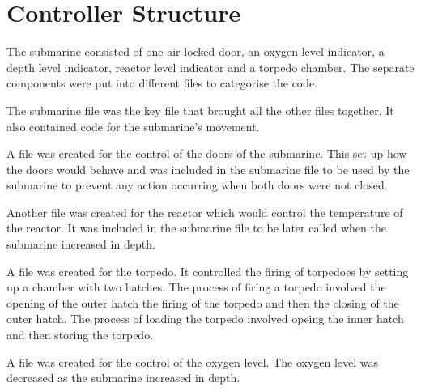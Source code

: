 \section{Controller Structure}

The submarine consisted of one air-locked door, an oxygen level indicator, a depth level indicator, reactor level indicator and a torpedo chamber. The separate components were put into different files to categorise the code.

The submarine file was the key file that brought all the other files together. It also contained code for the submarine's movement.

A file was created for the control of the doors of the submarine. This set up how the doors would behave and was included in the submarine file to be used by the submarine to prevent any action occurring when both doors were not closed. 

Another file was created for the reactor which would control the temperature of the reactor. It was included in the submarine file to be later called when the submarine increased in depth.

A file was created for the torpedo. It controlled the firing of torpedoes by setting up a chamber with two hatches. The process of firing a torpedo involved the opening of the outer hatch the firing of the torpedo and then the closing of the outer hatch. The process of loading the torpedo involved opeing the inner hatch and then storing the torpedo.

A file was created for the control of the oxygen level. The oxygen level was decreased as the submarine increased in depth.